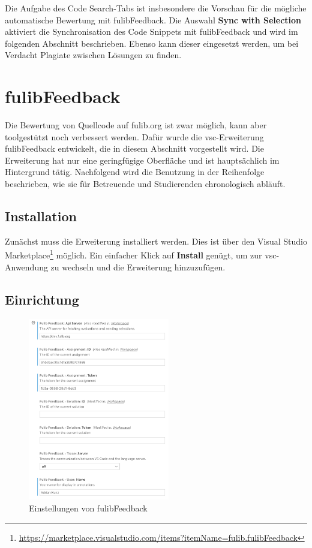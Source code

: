 Die Aufgabe des Code Search-Tabs ist insbesondere die Vorschau für die mögliche automatische Bewertung mit fulibFeedback.
Die Auswahl \textbf{Sync with Selection} aktiviert die Synchronisation des Code Snippets mit fulibFeedback und wird im folgenden Abschnitt beschrieben.
Ebenso kann dieser eingesetzt werden, um bei Verdacht Plagiate zwischen Lösungen zu finden.

\section{fulibFeedback}\label{sec:fulibFeedback}

Die Bewertung von Quellcode auf fulib.org ist zwar möglich, kann aber toolgestützt noch verbessert werden.
Dafür wurde die \ac{vsc}-Erweiterung fulibFeedback entwickelt, die in diesem Abschnitt vorgestellt wird.
Die Erweiterung hat nur eine geringfügige Oberfläche und ist hauptsächlich im Hintergrund tätig.
Nachfolgend wird die Benutzung in der Reihenfolge beschrieben, wie sie für Betreuende und Studierenden chronologisch abläuft.

\subsection{Installation}

Zunächst muss die Erweiterung installiert werden.
Dies ist über den Visual Studio Marketplace\footnote{
    \url{https://marketplace.visualstudio.com/items?itemName=fulib.fulibFeedback}
} möglich.
Ein einfacher Klick auf \textbf{Install} genügt, um zur \ac{vsc}-Anwendung zu wechseln und die Erweiterung hinzuzufügen.

\subsection{Einrichtung}

\begin{figure}
    \centering
    \includegraphics[width=0.55\textwidth]{images/fulibFeedback-settings.png}
    \caption{Einstellungen von fulibFeedback}
    \label{fig:fulibFeedback-settings}
\end{figure}

